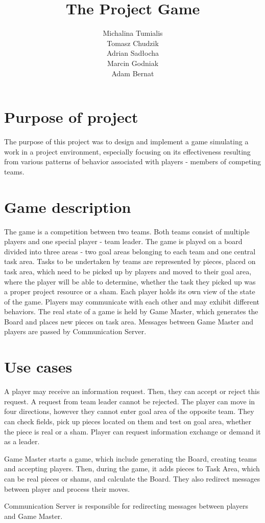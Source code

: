\documentclass[a4paper]{article}
\title{The Project Game}
\author{
Michalina Tumialis \\
Tomasz Chudzik \\
Adrian Sadłocha \\
Marcin Godniak \\
Adam Bernat
}
\begin{document}
\maketitle
\newpage
\section{Purpose of project}

The purpose of this project was to design and implement a game simulating a work in a project environment, especially focusing on its effectiveness resulting from various patterns of behavior associated with players - members of competing teams.

\section{Game description}

The game is a competition between two teams. Both teams consist of multiple players and one special player - team leader.
The game is played on a board divided into three areas - two goal areas belonging to each team and one central task area.
Tasks to be undertaken by teams are represented by pieces, placed on task area, which need to be picked up by players and moved to their goal area, where the player will be able to determine, whether the task they picked up was a proper project resource or a sham. 
Each player holds its own view of the state of the game. 
Players may communicate with each other and may exhibit different behaviors. 
The real state of a game is held by Game Master, which generates the Board and places new pieces on task area. 
Messages between Game Master and players are passed by Communication Server.
\newpage
\section{Use cases}

A player may receive an information request. Then, they can accept or reject this request. A request from team leader cannot be rejected. The player can move in four directions, however they cannot enter goal area of the opposite team. They can check fields, pick up pieces located on them and test on goal area, whether the piece is real or a sham.  Player can request information exchange or demand it as a leader.

Game Master starts a game, which include generating the Board, creating teams and accepting players. Then, during the game, it adds pieces to Task Area, which can be real pieces or shams, and calculate the Board. They also redirect messages between player and process their moves.

Communication Server is responsible for redirecting messages between players and Game Master.
\newline
\end{document}
